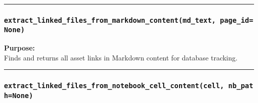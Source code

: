 \begin{center}\rule{0.5\linewidth}{0.5pt}\end{center}

\subsubsection{\texorpdfstring{\texttt{extract\_linked\_files\_from\_markdown\_content(md\_text,\ page\_id=None)}}{extract\_linked\_files\_from\_markdown\_content(md\_text, page\_id=None)}}\label{extract_linked_files_from_markdown_contentmd_text-page_idnone}

\begin{Shaded}
\begin{Highlighting}[]
\OperatorTok{=}\NormalTok{):}
\end{Highlighting}
\end{Shaded}

\textbf{Purpose:}\\
Finds and returns all asset links in Markdown content for database
tracking.

\begin{center}\rule{0.5\linewidth}{0.5pt}\end{center}

\subsubsection{\texorpdfstring{\texttt{extract\_linked\_files\_from\_notebook\_cell\_content(cell,\ nb\_path=None)}}{extract\_linked\_files\_from\_notebook\_cell\_content(cell, nb\_path=None)}}\label{extract_linked_files_from_notebook_cell_contentcell-nb_pathnone}

\begin{Shaded}
\begin{Highlighting}[]
\OperatorTok{=}\NormalTok{):}
\end{Highlighting}
\end{Shaded}


